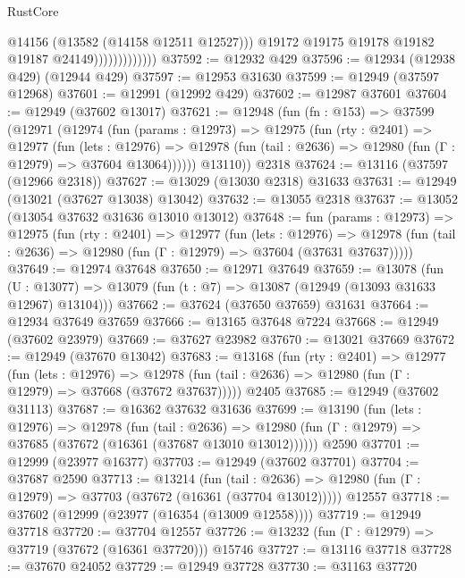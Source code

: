 \begin{lexlean}{RustCore}
\begin{coremodule}
                                @14156
                                (@13582 (@14158 @12511 @12527)))
                              @19172
                              @19175
                              @19178
                              @19182
                              @19187
                              @24149)))))))))))))
@37592 := @12932 @429
@37596 := @12934 (@12938 @429) (@12944 @429)
@37597 := @12953 @31630
@37599 := @12949 (@37597 @12968)
@37601 := @12991 (@12992 @429)
@37602 := @12987 @37601
@37604 := @12949 (@37602 @13017)
@37621 := @12948
    (fun (fn : @153) =>
    @37599
      (@12971
        (@12974
          (fun (params : @12973) =>
          @12975
            (fun (rty : @2401) =>
            @12977
              (fun (lets : @12976) =>
              @12978 (fun (tail : @2636) => @12980 (fun (Γ : @12979) => @37604 @13064))))))
        @13110))
    @2318
@37624 := @13116 (@37597 (@12966 @2318))
@37627 := @13029 (@13030 @2318) @31633
@37631 := @12949 (@13021 (@37627 @13038) @13042)
@37632 := @13055 @2318
@37637 := @13052 (@13054 @37632 @31636 @13010 @13012)
@37648 := fun (params : @12973) =>
  @12975
    (fun (rty : @2401) =>
    @12977
      (fun (lets : @12976) =>
      @12978 (fun (tail : @2636) => @12980 (fun (Γ : @12979) => @37604 (@37631 @37637)))))
@37649 := @12974 @37648
@37650 := @12971 @37649
@37659 := @13078
    (fun (U : @13077) => @13079 (fun (t : @7) => @13087 (@12949 (@13093 @31633 @12967) @13104)))
@37662 := @37624 (@37650 @37659) @31631
@37664 := @12934 @37649 @37659
@37666 := @13165 @37648 @7224
@37668 := @12949 (@37602 @23979)
@37669 := @37627 @23982
@37670 := @13021 @37669
@37672 := @12949 (@37670 @13042)
@37683 := @13168
    (fun (rty : @2401) =>
    @12977
      (fun (lets : @12976) =>
      @12978 (fun (tail : @2636) => @12980 (fun (Γ : @12979) => @37668 (@37672 @37637)))))
    @2405
@37685 := @12949 (@37602 @31113)
@37687 := @16362 @37632 @31636
@37699 := @13190
    (fun (lets : @12976) =>
    @12978
      (fun (tail : @2636) =>
      @12980 (fun (Γ : @12979) => @37685 (@37672 (@16361 (@37687 @13010 @13012))))))
    @2590
@37701 := @12999 (@23977 @16377)
@37703 := @12949 (@37602 @37701)
@37704 := @37687 @2590
@37713 := @13214
    (fun (tail : @2636) => @12980 (fun (Γ : @12979) => @37703 (@37672 (@16361 (@37704 @13012)))))
    @12557
@37718 := @37602 (@12999 (@23977 (@16354 (@13009 @12558))))
@37719 := @12949 @37718
@37720 := @37704 @12557
@37726 := @13232 (fun (Γ : @12979) => @37719 (@37672 (@16361 @37720))) @15746
@37727 := @13116 @37718
@37728 := @37670 @24052
@37729 := @12949 @37728
@37730 := @31163 @37720

\end{coremodule}
\end{lexlean}

